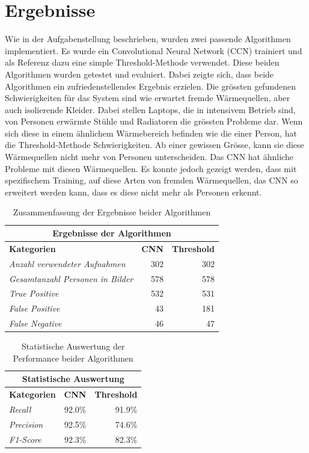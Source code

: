\documentclass[
	a4paper
]{scrartcl}
\begin{document}
\section{Ergebnisse}
Wie in der Aufgabenstellung beschrieben, wurden zwei passende Algorithmen implementiert. Es wurde ein Convolutional Neural Network (CCN) trainiert und als Referenz dazu eine simple Threshold-Methode verwendet. Diese beiden Algorithmen wurden getestet und evaluiert. Dabei zeigte sich, dass beide Algorithmen ein zufriedenstellendes Ergebnis erzielen. Die grössten gefundenen Schwierigkeiten für das System sind wie erwartet fremde Wärmequellen, aber auch isolierende Kleider. Dabei stellen Laptops, die in intensivem Betrieb sind, von Personen erwärmte Stühle und Radiatoren die grössten Probleme dar. Wenn sich diese in einem ähnlichem Wärmebereich befinden wie die einer Person, hat die Threshold-Methode Schwierigkeiten. Ab einer gewissen Grösse, kann sie diese Wärmequellen nicht mehr von Personen unterscheiden. Das CNN hat ähnliche Probleme mit diesen Wärmequellen. Es konnte jedoch gezeigt werden, dass mit spezifischem Training, auf diese Arten von fremden Wärmequellen, das CNN so erweitert werden kann, dass es diese nicht mehr als Personen erkennt. 
{
	\renewcommand{\arraystretch}{1.3}
	
	\begin{table}[H]
		\scriptsize
		\centering
		\begin{tabularx}{.5\textwidth}{Xrr}\\
			\hline
			\multicolumn{3}{c}{\textbf{Ergebnisse der Algorithmen}}\\
			\hline
			\textbf{Kategorien} & \textbf{CNN} & \textbf{Threshold}\\
			\hline
			\textit{Anzahl verwendeter Aufnahmen} & 302 & 302\\
			\hline 
			\textit{Gesamtanzahl Personen in Bilder} & 578 & 578\\
			\hline
			\textit{True Positive} & 532 & 531\\
			\hline
			\textit{False Positive} & 43 & 181\\
			\hline
			\textit{False Negative} & 46 & 47\\
		\end{tabularx}
		\caption{Zusammenfassung der Ergebnisse beider Algorithmen}
		\label{tab:results}
	\end{table}
	\begin{table}[H]
		\scriptsize
		\centering
		\begin{tabularx}{.5\textwidth}{Xrr}
			\hline
			\multicolumn{3}{c}{\textbf{Statistische Auswertung}}\\
			\hline
			\textbf{Kategorien} & \textbf{CNN} & \textbf{Threshold}\\
			\hline
			\textit{Recall} & 92.0\% & 91.9\%\\
			\hline  
			\textit{Precision} & 92.5\% & 74.6\%\\
			\hline
			\textit{F1-Score} & 92.3\% & 82.3\%\\
			\hline
		\end{tabularx}
		\caption{Statistische Auswertung der Performance beider Algorithmen}
		\label{tbl:heatSources}
	\end{table}
}
\end{document}
